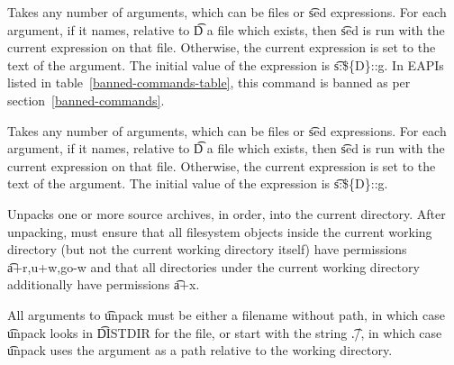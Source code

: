 \begin{description}
\IFKDEBUILDELSE
{
    \item[dosed] Takes any number of arguments, which can be files or \t{sed} expressions. For each
        argument, if it names, relative to \t{D} a file which exists, then \t{sed} is run with the
        current expression on that file. Otherwise, the current expression is set to the text of the
        argument. The initial value of the expression is \t{s:\$\{D\}::g}. In EAPIs listed in
        table~\ref{banned-commands-table}, this command is banned as per
        section~\ref{banned-commands}.
}{
    \item[dosed] Takes any number of arguments, which can be files or \t{sed} expressions. For each
        argument, if it names, relative to \t{D} a file which exists, then \t{sed} is run with the
        current expression on that file. Otherwise, the current expression is set to the text of the
        argument. The initial value of the expression is \t{s:\$\{D\}::g}.
}

\item[unpack] Unpacks one or more source archives, in order, into the current directory. After
    unpacking, must ensure that all filesystem objects inside the current working directory (but not
    the current working directory itself) have permissions \t{a+r,u+w,go-w} and that all directories
    under the current working directory additionally have permissions \t{a+x}.

    All arguments to \t{unpack} must be either a filename without path, in which case \t{unpack}
    looks in \t{DISTDIR} for the file, or start with the string \t{./}, in which case \t{unpack}
    uses the argument as a path relative to the working directory.


\end{description}
